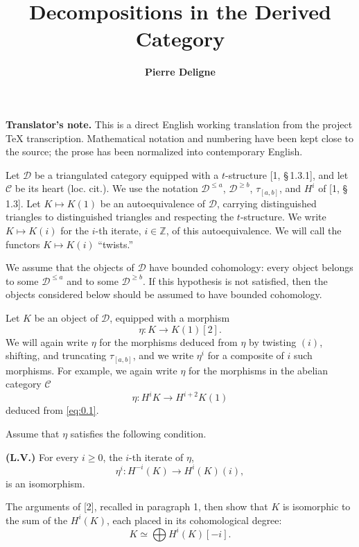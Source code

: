 \documentclass[11pt,a4paper]{article}
\title{\textbf{Decompositions in the Derived Category}}
\author{\textbf{Pierre Deligne}}
\date{}
\theoremstyle{plain}
\theoremstyle{definition}
\theoremstyle{remark}
\newcommand{\cD}{\mathscr{D}}
\newcommand{\cC}{\mathscr{C}}
\begin{document}
\maketitle

\noindent\textbf{Translator's note.} This is a direct English working translation from the project TeX transcription. Mathematical notation and numbering have been kept close to the source; the prose has been normalized into contemporary English.

\medskip

Let $\cD$ be a triangulated category equipped with a $t$-structure [1, \S\,1.3.1], and let $\cC$ be its heart (loc. cit.). We use the notation $\cD^{\leqslant a}$, $\cD^{\geqslant b}$, $\tau_{[a,b]}$, and $H^i$ of [1, \S\,1.3]. Let $K\mapsto K(1)$ be an autoequivalence of $\cD$, carrying distinguished triangles to distinguished triangles and respecting the $t$-structure. We write $K\mapsto K(i)$ for the $i$-th iterate, $i\in\mathbb{Z}$, of this autoequivalence. We will call the functors $K\mapsto K(i)$ ``twists.''

We assume that the objects of $\cD$ have bounded cohomology: every object belongs to some $\cD^{\leqslant a}$ and to some $\cD^{\geqslant b}$. If this hypothesis is not satisfied, then the objects considered below should be assumed to have bounded cohomology.

Let $K$ be an object of $\cD$, equipped with a morphism
\begin{equation}\label{eq:0.1}
\eta\colon K\to K(1)[2].
\end{equation}
We will again write $\eta$ for the morphisms deduced from $\eta$ by twisting $(i)$, shifting, and truncating $\tau_{[a,b]}$, and we write $\eta^i$ for a composite of $i$ such morphisms. For example, we again write $\eta$ for the morphisms in the abelian category $\cC$
\begin{equation}\label{eq:0.2}
\eta\colon H^iK\to H^{i+2}K(1)
\end{equation}
deduced from \eqref{eq:0.1}.

Assume that $\eta$ satisfies the following condition.

\smallskip
\noindent\textbf{(L.V.)} For every $i\geqslant0$, the $i$-th iterate of $\eta$,
\[
\eta^i\colon H^{-i}(K)\to H^i(K)(i),
\]
is an isomorphism.
\smallskip

The arguments of [2], recalled in paragraph 1, then show that $K$ is isomorphic to the sum of the $H^i(K)$, each placed in its cohomological degree:
\begin{equation}\label{eq:0.3}
K\simeq \bigoplus H^i(K)[-i].
\end{equation}
\end{document}
